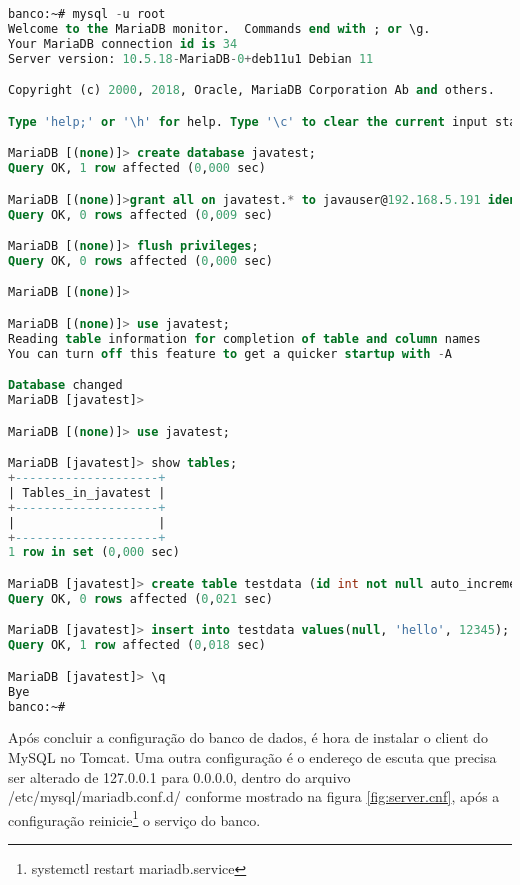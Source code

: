 \hypertarget{criandobancodados}{}
\begin{lstlisting}[language=sql,breaklines=true,basicstyle=\ttfamily, 
label=criandobancodados0 ,
breaklines=true,caption=\firacoderetina Criar banco e tabelas, 
postbreak=\mbox{\textcolor{red}{$\hookrightarrow$}\space},
showstringspaces=false]
banco:~# mysql -u root
Welcome to the MariaDB monitor.  Commands end with ; or \g.
Your MariaDB connection id is 34
Server version: 10.5.18-MariaDB-0+deb11u1 Debian 11

Copyright (c) 2000, 2018, Oracle, MariaDB Corporation Ab and others.

Type 'help;' or '\h' for help. Type '\c' to clear the current input statement.

MariaDB [(none)]> create database javatest;
Query OK, 1 row affected (0,000 sec)

MariaDB [(none)]>grant all on javatest.* to javauser@192.168.5.191 identified by 'javadude';
Query OK, 0 rows affected (0,009 sec)

MariaDB [(none)]> flush privileges;
Query OK, 0 rows affected (0,000 sec)

MariaDB [(none)]> 

MariaDB [(none)]> use javatest;
Reading table information for completion of table and column names
You can turn off this feature to get a quicker startup with -A

Database changed
MariaDB [javatest]>

MariaDB [(none)]> use javatest;

MariaDB [javatest]> show tables;
+--------------------+
| Tables_in_javatest |
+--------------------+
|                    |
+--------------------+
1 row in set (0,000 sec)

MariaDB [javatest]> create table testdata (id int not null auto_increment primary key,foo varchar(25),bar int);
Query OK, 0 rows affected (0,021 sec)

MariaDB [javatest]> insert into testdata values(null, 'hello', 12345);
Query OK, 1 row affected (0,018 sec)

MariaDB [javatest]> \q
Bye
banco:~#
\end{lstlisting}


Após concluir a configuração do banco de dados, é hora de instalar o client do MySQL no Tomcat. Uma outra configuração é o endereço de escuta que precisa ser alterado de 127.0.0.1 para 0.0.0.0, dentro do arquivo /etc/mysql/mariadb.conf.d/ conforme mostrado na figura \ref{fig:server.cnf}, após a configuração reinicie\footnote{systemctl restart mariadb.service} o serviço do banco.

